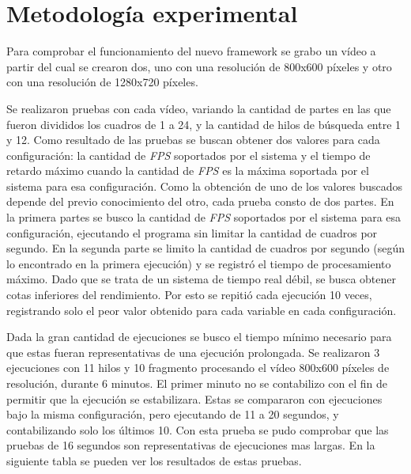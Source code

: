 
\section{Metodología experimental}

Para comprobar el funcionamiento del nuevo framework se grabo un vídeo a partir
del cual se crearon dos, uno con una resolución de 800x600 píxeles y otro con
una resolución de 1280x720 píxeles.

Se realizaron pruebas con cada vídeo, variando la cantidad de partes en las que
fueron divididos los cuadros de 1 a 24, y la cantidad de hilos de búsqueda entre
1 y 12. Como resultado de las pruebas se buscan obtener dos valores para cada
configuración: la cantidad de \emph{FPS} soportados por el sistema y el tiempo
de retardo máximo cuando la cantidad de \emph{FPS} es la máxima soportada por el
sistema para esa configuración. Como la obtención de uno de los valores buscados
depende del previo conocimiento del otro, cada prueba consto de dos partes.
En la primera partes se busco la cantidad de \emph{FPS} soportados por el
sistema para esa configuración, ejecutando el programa sin limitar la cantidad
de cuadros por segundo. En la segunda parte se limito la cantidad de
cuadros por segundo (según lo encontrado en la primera ejecución) y se registró
el tiempo de procesamiento máximo. Dado que se trata de un sistema de
tiempo real débil, se busca obtener cotas inferiores del rendimiento. Por esto
se repitió cada ejecución 10 veces, registrando solo el peor valor obtenido para
cada variable en cada configuración.

Dada la gran cantidad de ejecuciones se busco el tiempo mínimo necesario para
que estas fueran representativas de una ejecución prolongada. Se realizaron 3
ejecuciones con 11 hilos y 10 fragmento procesando el vídeo 800x600 píxeles de
resolución, durante 6 minutos. El primer minuto no se contabilizo con el fin de
permitir que la ejecución se estabilizara.  Estas se compararon con ejecuciones
bajo la misma configuración, pero ejecutando de 11 a 20 segundos, y
contabilizando solo los últimos 10. Con esta prueba se pudo comprobar que las
pruebas de 16 segundos son representativas de ejecuciones mas largas. En la
siguiente tabla se pueden ver los resultados de estas pruebas.

